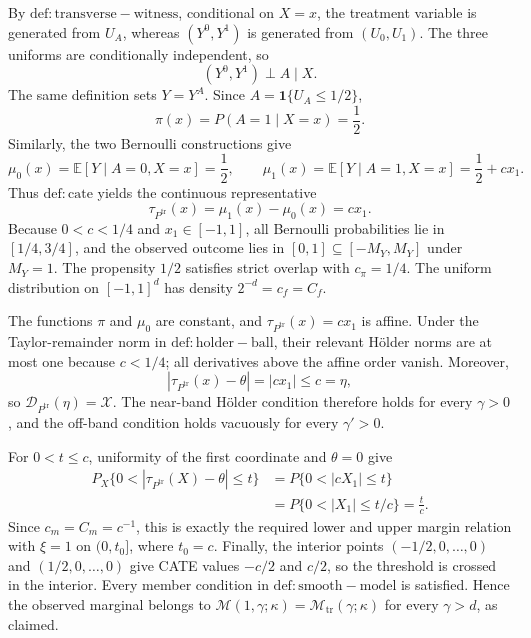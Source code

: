 By \(\mathrm{def:transverse-witness}\), conditional on \(X=x\), the treatment variable is generated from \(U_A\), whereas \((Y^0,Y^1)\) is generated from \((U_0,U_1)\). The three uniforms are conditionally independent, so
\[
(Y^0,Y^1)\perp A\mid X.
\]
The same definition sets \(Y=Y^A\). Since \(A=\mathbf 1\{U_A\le 1/2\}\),
\[
\pi(x)=P(A=1\mid X=x)=\frac12.
\]
Similarly, the two Bernoulli constructions give
\[
\mu_0(x)=\mathbb E[Y\mid A=0,X=x]=\frac12,
\qquad
\mu_1(x)=\mathbb E[Y\mid A=1,X=x]=\frac12+cx_1.
\]
Thus \(\mathrm{def:cate}\) yields the continuous representative
\[
\tau_{P^{\mathrm{tr}}}(x)=\mu_1(x)-\mu_0(x)=cx_1.
\]
Because \(0<c<1/4\) and \(x_1\in[-1,1]\), all Bernoulli probabilities lie in \([1/4,3/4]\), and the observed outcome lies in \([0,1]\subseteq[-M_Y,M_Y]\) under \(M_Y=1\). The propensity \(1/2\) satisfies strict overlap with \(c_\pi=1/4\). The uniform distribution on \([-1,1]^d\) has density \(2^{-d}=c_f=C_f\).

The functions \(\pi\) and \(\mu_0\) are constant, and \(\tau_{P^{\mathrm{tr}}}(x)=cx_1\) is affine. Under the Taylor-remainder norm in \(\mathrm{def:holder-ball}\), their relevant Hölder norms are at most one because \(c<1/4\); all derivatives above the affine order vanish. Moreover,
\[
|\tau_{P^{\mathrm{tr}}}(x)-\theta|=|cx_1|\le c=\eta,
\]
so \(\mathcal D_{P^{\mathrm{tr}}}(\eta)=\mathcal X\). The near-band Hölder condition therefore holds for every \(\gamma>0\), and the off-band condition holds vacuously for every \(\gamma'>0\).

For \(0<t\le c\), uniformity of the first coordinate and \(\theta=0\) give
\[
\begin{aligned}
P_X\{0<|\tau_{P^{\mathrm{tr}}}(X)-\theta|\le t\}
&=P\{0<|cX_1|\le t\}\\
&=P\{0<|X_1|\le t/c\}
=\frac{t}{c}.
\end{aligned}
\]
Since \(c_m=C_m=c^{-1}\), this is exactly the required lower and upper margin relation with \(\xi=1\) on \((0,t_0]\), where \(t_0=c\). Finally, the interior points \((-1/2,0,\ldots,0)\) and \((1/2,0,\ldots,0)\) give CATE values \(-c/2\) and \(c/2\), so the threshold is crossed in the interior. Every member condition in \(\mathrm{def:smooth-model}\) is satisfied. Hence the observed marginal belongs to \(\mathcal M(1,\gamma;\kappa)=\mathcal M_{\mathrm{tr}}(\gamma;\kappa)\) for every \(\gamma>d\), as claimed.